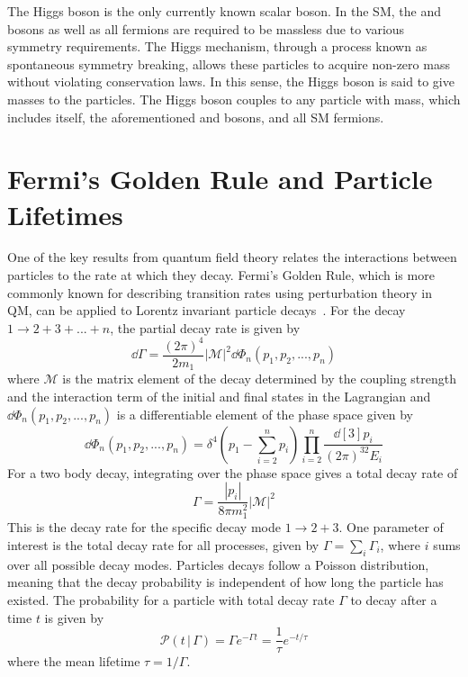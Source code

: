 The Higgs boson is the only currently known scalar boson. In the SM, the \PZ and \PWpm bosons as well as all fermions are required to be massless due to various symmetry requirements. The Higgs mechanism, through a process known as spontaneous symmetry breaking, allows these particles to acquire non-zero mass without violating conservation laws. In this sense, the Higgs boson is said to give masses to the particles. The Higgs boson couples to any particle with mass, which includes itself, the aforementioned \PZ and \PWpm bosons, and all SM fermions.

\section{Fermi's Golden Rule and Particle Lifetimes} \label{sec:theory_fermi}
One of the key results from quantum field theory relates the interactions between particles to the rate at which they decay. Fermi's Golden Rule, which is more commonly known for describing transition rates using perturbation theory in QM, can be applied to Lorentz invariant particle decays~\cite{pdg2024}. For the decay $1\to2+3+...+n$, the partial decay rate is given by
\begin{equation}
	\dd{\Gamma}=\frac{(2\pi)^4}{2m_1}|\mathcal{M}|^2\dd{\Phi_n(p_1,p_2,...,p_n)}
\end{equation}
where $\mathcal{M}$ is the matrix element of the decay determined by the coupling strength and the interaction term of the initial and final states in the Lagrangian and $\dd{\Phi_n(p_1,p_2,...,p_n)}$ is a differentiable element of the phase space given by
\begin{equation}
	\dd{\Phi_n(p_1,p_2,...,p_n)}=\delta^4(p_1-\sum_{i=2}^n p_i)\prod_{i=2}^n\frac{\dd[3]{p_i}}{(2\pi)^32E_i}
\end{equation}
For a two body decay, integrating over the phase space gives a total decay rate of
\begin{equation}
	\Gamma=\frac{|p_i|}{8\pi m_1^2}|\mathcal{M}|^2
\end{equation}
This is the decay rate for the specific decay mode $1\to2+3$. One parameter of interest is the total decay rate for all processes, given by $\Gamma=\sum_{i}\Gamma_i$, where $i$ sums over all possible decay modes. Particles decays follow a Poisson distribution, meaning that the decay probability is independent of how long the particle has existed. The probability for a particle with total decay rate $\Gamma$ to decay after a time $t$ is given by
\begin{equation}
	\mathcal{P}(t\,|\,\Gamma)=\Gamma e^{-\Gamma t}=\frac{1}{\tau}e^{-t/\tau}
\end{equation}
where the mean lifetime $\tau=1/\Gamma$.


